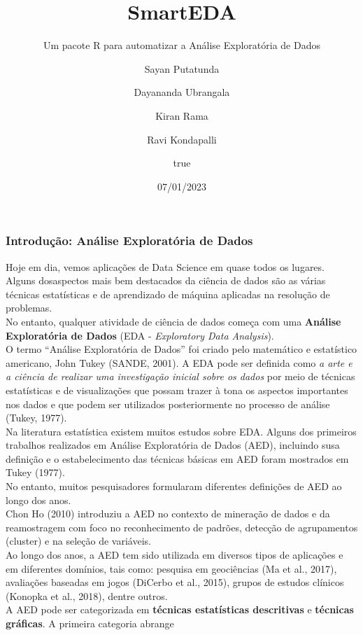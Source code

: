 \documentclass[
]{article}
\title{SmartEDA}
\subtitle{Um pacote R para automatizar a Análise Exploratória de Dados}
\author{Sayan Putatunda \and Dayananda Ubrangala \and Kiran
Rama \and Ravi Kondapalli \and true}
\date{07/01/2023}
\begin{document}
\maketitle

\hypertarget{introduuxe7uxe3o-anuxe1lise-exploratuxf3ria-de-dados}{%
\subsubsection{Introdução: Análise Exploratória de
Dados}\label{introduuxe7uxe3o-anuxe1lise-exploratuxf3ria-de-dados}}

Hoje em dia, vemos aplicações de Data Science em quase todos os
lugares.\\
Alguns dosaspectos mais bem destacados da ciência de dados são as várias
técnicas estatísticas e de aprendizado de máquina aplicadas na resolução
de problemas.\\
No entanto, qualquer atividade de ciência de dados começa com uma
\textbf{Análise Exploratória de Dados} (EDA - \emph{Exploratory Data
Analysis}).\\
O termo ``Análise Exploratória de Dados'' foi criado pelo matemático e
estatístico americano, John Tukey (SANDE, 2001). A EDA pode ser definida
como \emph{a arte e a ciência de realizar uma investigação inicial sobre
os dados} por meio de técnicas estatísticas e de visualizações que
possam trazer à tona os aspectos importantes nos dados e que podem ser
utilizados posteriormente no processo de análise (Tukey, 1977).\\
Na literatura estatística existem muitos estudos sobre EDA. Alguns dos
primeiros trabalhos realizados em Análise Exploratória de Dados (AED),
incluindo susa definição e o estabelecimento das técnicas básicas em AED
foram mostrados em Tukey (1977).\\
No entanto, muitos pesquisadores formularam diferentes definições de AED
ao longo dos anos.\\
Chon Ho (2010) introduziu a AED no contexto de mineração de dados e da
reamostragem com foco no reconhecimento de padrões, detecção de
agrupamentos (cluster) e na seleção de variáveis.\\
Ao longo dos anos, a AED tem sido utilizada em diversos tipos de
aplicações e em diferentes domínios, tais como: pesquisa em geociências
(Ma et al., 2017), avaliações baseadas em jogos (DiCerbo et al., 2015),
grupos de estudos clínicos (Konopka et al., 2018), dentre outros.\\
A AED pode ser categorizada em \textbf{técnicas estatísticas
descritivas} e \textbf{técnicas gráficas}. A primeira categoria abrange
\end{document}
